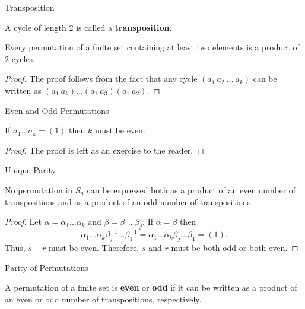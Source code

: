 \documentclass{beamer}
\begin{document}
\begin{frame}{Transposition}
\begin{definition}
\justifying
A cycle of length 2 is called a \textbf{transposition}.
\end{definition} 
\pause
\begin{theorem}
\justifying
Every permutation of a finite set containing at least two elements is a product of $2$-cycles.
\end{theorem}
\pause
\begin{proof}
\justifying
The proof follows from the fact that any cycle $(a_1 \ a_2 \ \dots \ a_k)$ can be written as $(a_1 \ a_k)\dots(a_1 \ a_3)(a_1 \ a_2)$.   
\end{proof}
\end{frame}

\begin{frame}{Even and Odd Permutations}
\begin{lemma}
If $\sigma_1\dots\sigma_k = (1)$ then $k$ must be even. 
\end{lemma}
\pause
\begin{proof}
The proof is left as an exercise to the reader.    
\end{proof}
\end{frame}

\begin{frame}{Unique Parity}
\begin{theorem}
\justifying
No permutation in $S_n$ can be expressed both as a product of an even number of transpositions and as a product of an odd number of transpositions.
\end{theorem}
\pause
\begin{proof}
Let $\alpha = \alpha_1\dots\alpha_k$ and $\beta = \beta_1\dots\beta_j$. If $\alpha = \beta$ then 
\[
\alpha_1\dots\alpha_k\beta_j^{-1}\dots\beta_1^{-1} = \alpha_1\dots\alpha_k\beta_j\dots\beta_1 = (1).
\]
Thus, $s + r$ must be even. Therefore, $s$ and $r$ must be both odd or both even.
\end{proof}
\end{frame}

\begin{frame}{Parity of Permutations}
\begin{definition}
\justifying
A permutation of a finite set is \textbf{even} or \textbf{odd} if it can be written as a product of an even or odd number of transpositions, respectively.
\end{definition}
\end{frame}
\end{document}
